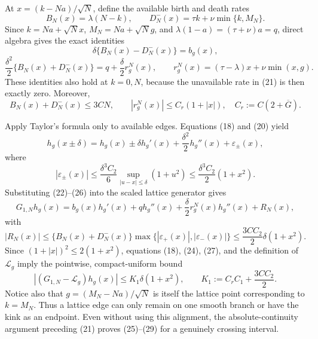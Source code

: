 At \(x=(k-Na)/\sqrt N\), define the available birth and death rates
\[
 B_N(x)=\lambda(N-k),
 \qquad D_N^-(x)=\tau k+\nu\min\{k,M_N\}.
 \tag{21}
\]
Since \(k=Na+\sqrt N x\), \(M_N=Na+\sqrt N g\), and \(\lambda(1-a)=(\tau+\nu)a=q\), direct algebra gives the exact identities
\[
 \delta\{B_N(x)-D_N^-(x)\}=b_g(x),
 \tag{22}
\]
\[
 \frac{\delta^2}{2}\{B_N(x)+D_N^-(x)\}
 =q+\frac\delta2 r_g^N(x),
 \qquad
 r_g^N(x)=(\tau-\lambda)x+\nu\min(x,g).
 \tag{23}
\]
These identities also hold at \(k=0,N\), because the unavailable rate in (21) is then exactly zero.  Moreover,
\[
 B_N(x)+D_N^-(x)\leq3CN,
 \qquad
 |r_g^N(x)|\leq C_r(1+|x|),
 \quad C_r:=C(2+\overline G).
 \tag{24}
\]

Apply Taylor's formula only to available edges.  Equations (18) and (20) yield
\[
 h_g(x\mathbin{\pm}\delta)
 =h_g(x)\mathbin{\pm}\delta h_g'(x)
   +\frac{\delta^2}{2}h_g''(x)+\varepsilon_\pm(x),
 \tag{25}
\]
where
\[
 |\varepsilon_\pm(x)|
 \leq\frac{\delta^3C_2}{6}
       \sup_{|u-x|\leq\delta}(1+u^2)
 \leq\frac{\delta^3C_2}{2}(1+x^2).
 \tag{26}
\]
Substituting (22)--(26) into the scaled lattice generator gives
\[
 G_{1,N}h_g(x)
 =b_g(x)h_g'(x)+qh_g''(x)
  +\frac\delta2r_g^N(x)h_g''(x)+R_N(x),
 \tag{27}
\]
with
\[
 |R_N(x)|
 \leq\{B_N(x)+D_N^-(x)\}
       \max\{|\varepsilon_+(x)|,|\varepsilon_-(x)|\}
 \leq\frac{3CC_2}{2}\delta(1+x^2).
 \tag{28}
\]
Since \((1+|x|)^2\leq2(1+x^2)\), equations (18), (24), (27), and the definition of \(\mathcal L_g\) imply the pointwise, compact-uniform bound
\[
 |(G_{1,N}-\mathcal L_g)h_g(x)|
 \leq K_1\delta(1+x^2),
 \qquad
 K_1:=C_rC_1+\frac{3CC_2}{2}.
 \tag{29}
\]
Notice also that \(g=(M_N-Na)/\sqrt N\) is itself the lattice point corresponding to \(k=M_N\).  Thus a lattice edge can only remain on one smooth branch or have the kink as an endpoint.  Even without using this alignment, the absolute-continuity argument preceding (21) proves (25)--(29) for a genuinely crossing interval.

